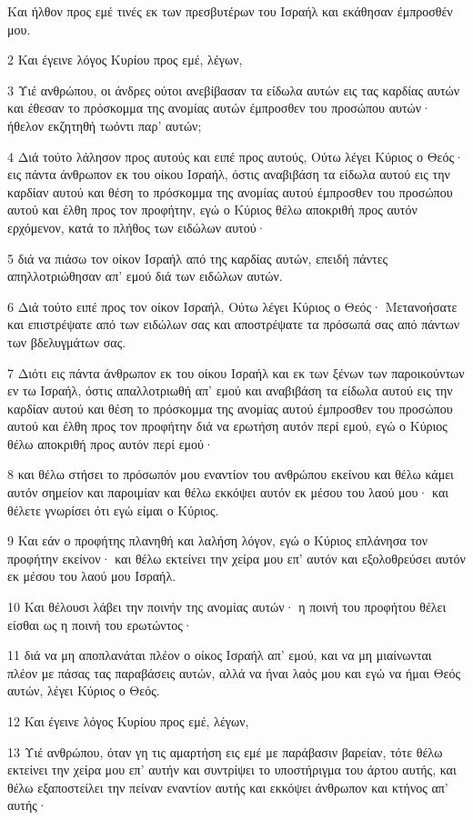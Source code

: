 \par Και ήλθον προς εμέ τινές εκ των πρεσβυτέρων του Ισραήλ και εκάθησαν έμπροσθέν μου.
\par 2 Και έγεινε λόγος Κυρίου προς εμέ, λέγων,
\par 3 Υιέ ανθρώπου, οι άνδρες ούτοι ανεβίβασαν τα είδωλα αυτών εις τας καρδίας αυτών και έθεσαν το πρόσκομμα της ανομίας αυτών έμπροσθεν του προσώπου αυτών· ήθελον εκζητηθή τωόντι παρ' αυτών;
\par 4 Διά τούτο λάλησον προς αυτούς και ειπέ προς αυτούς, Ούτω λέγει Κύριος ο Θεός· εις πάντα άνθρωπον εκ του οίκου Ισραήλ, όστις αναβιβάση τα είδωλα αυτού εις την καρδίαν αυτού και θέση το πρόσκομμα της ανομίας αυτού έμπροσθεν του προσώπου αυτού και έλθη προς τον προφήτην, εγώ ο Κύριος θέλω αποκριθή προς αυτόν ερχόμενον, κατά το πλήθος των ειδώλων αυτού·
\par 5 διά να πιάσω τον οίκον Ισραήλ από της καρδίας αυτών, επειδή πάντες απηλλοτριώθησαν απ' εμού διά των ειδώλων αυτών.
\par 6 Διά τούτο ειπέ προς τον οίκον Ισραήλ, Ούτω λέγει Κύριος ο Θεός· Μετανοήσατε και επιστρέψατε από των ειδώλων σας και αποστρέψατε τα πρόσωπά σας από πάντων των βδελυγμάτων σας.
\par 7 Διότι εις πάντα άνθρωπον εκ του οίκου Ισραήλ και εκ των ξένων των παροικούντων εν τω Ισραήλ, όστις απαλλοτριωθή απ' εμού και αναβιβάση τα είδωλα αυτού εις την καρδίαν αυτού και θέση το πρόσκομμα της ανομίας αυτού έμπροσθεν του προσώπου αυτού και έλθη προς τον προφήτην διά να ερωτήση αυτόν περί εμού, εγώ ο Κύριος θέλω αποκριθή προς αυτόν περί εμού·
\par 8 και θέλω στήσει το πρόσωπόν μου εναντίον του ανθρώπου εκείνου και θέλω κάμει αυτόν σημείον και παροιμίαν και θέλω εκκόψει αυτόν εκ μέσου του λαού μου· και θέλετε γνωρίσει ότι εγώ είμαι ο Κύριος.
\par 9 Και εάν ο προφήτης πλανηθή και λαλήση λόγον, εγώ ο Κύριος επλάνησα τον προφήτην εκείνον· και θέλω εκτείνει την χείρα μου επ' αυτόν και εξολοθρεύσει αυτόν εκ μέσου του λαού μου Ισραήλ.
\par 10 Και θέλουσι λάβει την ποινήν της ανομίας αυτών· η ποινή του προφήτου θέλει είσθαι ως η ποινή του ερωτώντος·
\par 11 διά να μη αποπλανάται πλέον ο οίκος Ισραήλ απ' εμού, και να μη μιαίνωνται πλέον με πάσας τας παραβάσεις αυτών, αλλά να ήναι λαός μου και εγώ να ήμαι Θεός αυτών, λέγει Κύριος ο Θεός.
\par 12 Και έγεινε λόγος Κυρίου προς εμέ, λέγων,
\par 13 Υιέ ανθρώπου, όταν γη τις αμαρτήση εις εμέ με παράβασιν βαρείαν, τότε θέλω εκτείνει την χείρα μου επ' αυτήν και συντρίψει το υποστήριγμα του άρτου αυτής, και θέλω εξαποστείλει την πείναν εναντίον αυτής και εκκόψει άνθρωπον και κτήνος απ' αυτής·
